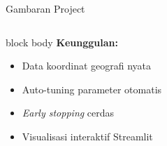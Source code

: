 \documentclass[aspectratio=169,10pt]{beamer}
\begin{document}
\begin{frame}{Gambaran Project}
\begin{columns}[T,totalwidth=\textwidth]
    \vspace{0.18cm}
    \begin{beamercolorbox}[wd=\linewidth,sep=8pt,rounded=true]{block body}
      \textbf{Keunggulan:}
      \begin{itemize}\small
        \item Data koordinat geografi nyata
        \item Auto-tuning parameter otomatis
        \item \textit{Early stopping} cerdas
        \item Visualisasi interaktif Streamlit
      \end{itemize}
    \end{beamercolorbox}
  \end{columns}
\end{frame}
\end{document}
